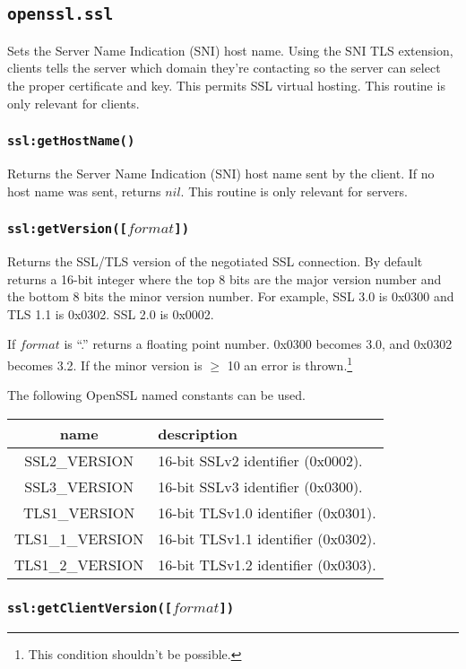\documentclass[11pt, oneside]{memoir}
\newcommand*{\fn}[1]{\texttt{#1}\xspace}
\newcounter{toccols}
\newenvironment{Module}[1]{
	\subsection{\texttt{#1}}
	\addtocontents{toc}{
		\protect\begin{multicols}{\value{toccols}}
	}
}{
	\addtocontents{toc}{\protect\end{multicols}}
}
\begin{document}
\begin{Module}{openssl.ssl}
Sets the Server Name Indication (SNI) host name. Using the SNI TLS extension, clients tells the server which domain they're contacting so the server can select the proper certificate and key. This permits SSL virtual hosting. This routine is only relevant for clients.

\subsubsection[\fn{ssl:getHostName}]{\fn{ssl:getHostName()}}

Returns the Server Name Indication (SNI) host name sent by the client. If no host name was sent, returns $nil$. This routine is only relevant for servers.

\subsubsection[\fn{ssl:getVersion}]{\fn{ssl:getVersion([$format$])}}

Returns the SSL/TLS version of the negotiated SSL connection. By default returns a 16-bit integer where the top 8 bits are the major version number and the bottom 8 bits the minor version number. For example, SSL 3.0 is 0x0300 and TLS 1.1 is 0x0302. SSL 2.0 is 0x0002.

If $format$ is ``.'' returns a floating point number. 0x0300 becomes 3.0, and 0x0302 becomes 3.2. If the minor version is $\geq$ 10 an error is thrown.\footnote{This condition shouldn't be possible.}

The following OpenSSL named constants can be used.

\begin{tabular}{ c | l }
name & description \\\hline
SSL2\_VERSION & 16-bit SSLv2 identifier (0x0002).  \\
SSL3\_VERSION & 16-bit SSLv3 identifier (0x0300).  \\
TLS1\_VERSION & 16-bit TLSv1.0 identifier (0x0301).  \\
TLS1\_1\_VERSION & 16-bit TLSv1.1 identifier (0x0302).  \\
TLS1\_2\_VERSION & 16-bit TLSv1.2 identifier (0x0303).  \\
\end{tabular}

\subsubsection[\fn{ssl:getClientVersion}]{\fn{ssl:getClientVersion([$format$])}}


\end{Module}
\end{document}
